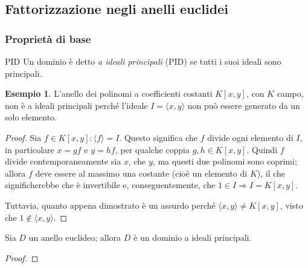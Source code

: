 \documentclass[11pt, a4paper]{scrartcl}
\theoremstyle{definition}
\newtheorem{esempio}{Esempio}
\numberwithin{esempio}{section}
\theoremstyle{definition}
\numberwithin{obs}{section}
\numberwithin{nota}{section}
\numberwithin{equation}{subsection}
\begin{document}
\subsection{Fattorizzazione negli anelli euclidei}
\subsubsection{Propriet\`a di base}
\begin{definizione}
	{PID}{}
	Un dominio \`e detto \textit{a ideali principali} (PID) se tutti i suoi ideali sono principali.
\end{definizione}
\begin{esempio}
	L'anello dei polinomi a coefficienti costanti $K[x,y]$, con $K$ campo, non \`e a ideali principali perch\'e l'ideale $I = \langle x,y \rangle$ non pu\`o essere generato da un solo elemento.
	\begin{proof}
		Sia $f \in K[x,y] : \langle f \rangle = I$.
		Questo significa che $f$ divide ogni elemento di $I$, in particolare $x = gf$ e $y = hf$, per qualche coppia $g,h \in K[x,y]$.
		Quindi $f$ divide contemporaneamente sia $x$, che $y$, ma questi due polinomi sono coprimi; allora $f$ deve essere al massimo una costante (cio\`e un elemento di $K$), il che significherebbe che \`e invertibile e, conseguentemente, che $1 \in I \Rightarrow I = K[x,y]$.

		Tuttavia, quanto appena dimostrato \`e un assurdo perch\'e $\langle x,y \rangle \neq K[x,y]$, visto che $1 \not \in \langle x,y \rangle$.
	\end{proof}
\end{esempio}
\begin{teorema}
	{}{}
	Sia $D$ un anello euclideo; allora $D$ \`e un dominio a ideali principali.
	\begin{proof}
		
	\end{proof}
\end{teorema}
\end{document}
